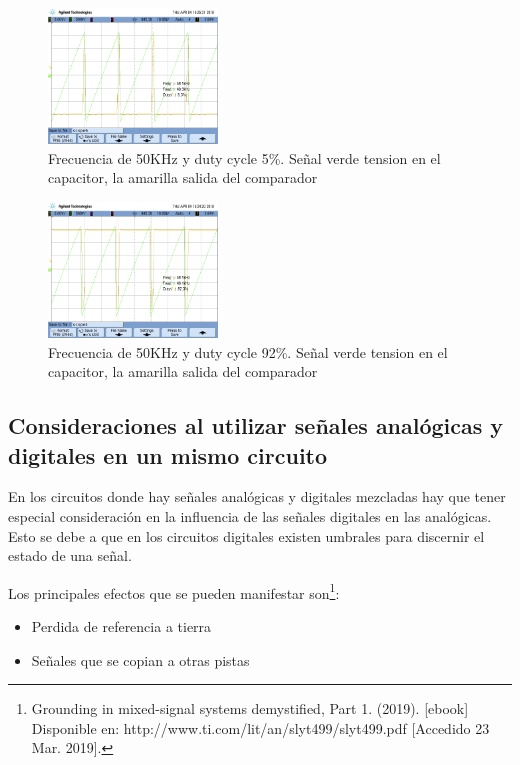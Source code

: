 \documentclass[../../ASSD_TP1_G7.tex]{subfiles}
\begin{document}
\begin{figure}[H]
\centering
\includegraphics[width=0.4\textwidth]{figures/scope6.png}
\caption{Frecuencia de 50KHz y duty cycle 5\%. Se\~nal verde tension en el capacitor, la amarilla salida del comparador}
\end{figure}

\begin{figure}[H]
\centering
\includegraphics[width=0.4\textwidth]{figures/scope4.png}
\caption{Frecuencia de 50KHz y duty cycle 92\%. Se\~nal verde tension en el capacitor, la amarilla salida del comparador}
\end{figure}





\subsection*{Consideraciones al utilizar se\~nales analógicas y digitales en un mismo circuito }
\par En los circuitos donde hay se\~nales analógicas y digitales mezcladas hay que tener especial consideración en la influencia de las se\~nales digitales en las analógicas. Esto se debe a que en los circuitos digitales existen umbrales para discernir el estado de una se\~nal. 
\par Los principales efectos que se pueden manifestar son\footnote{Grounding in mixed-signal systems demystified, Part 1. (2019). [ebook] Disponible en: http://www.ti.com/lit/an/slyt499/slyt499.pdf [Accedido 23 Mar. 2019].}:
\begin{itemize}
  \item Perdida de referencia a tierra 
  \item Se\~nales que se copian a otras pistas 

\end{itemize}
\end{document}
